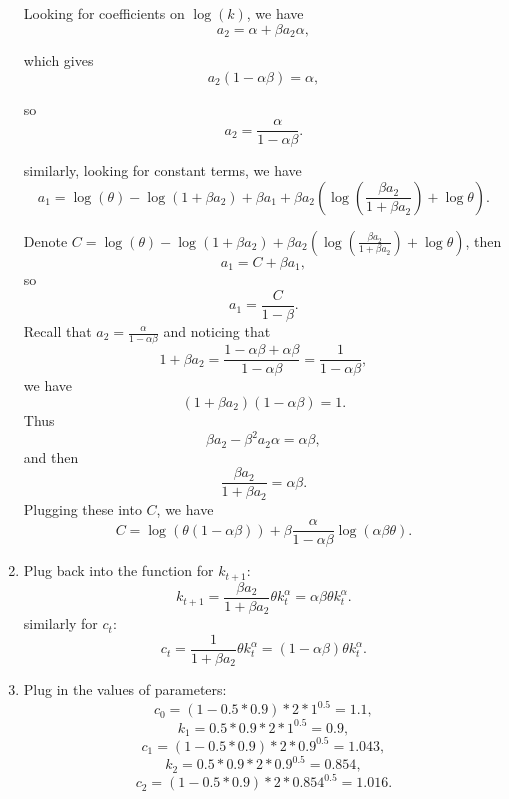 \documentclass[12pt]{article}
\begin{document}
\begin{enumerate}[label=\textbf{Question \arabic*:}, leftmargin=*, align=left]
Looking for coefficients on $\log(k)$, we have
\[
a_2 = \alpha + \beta a_2 \alpha,
\]

which gives
\[
a_2 (1 - \alpha \beta) = \alpha,
\]

so
\[
a_2 = \frac{\alpha}{1-\alpha\beta}.
\]

similarly, looking for constant terms, we have
\[
a_1 = \log(\theta) - \log(1+\beta a_2) + \beta a_1 
+ \beta a_2 \left( \log\left(\frac{\beta a_2}{1+\beta a_2}\right) + \log \theta \right).
\]

Denote $C = \log(\theta) - \log(1+\beta a_2) + \beta a_2 \left( \log\left(\frac{\beta a_2}{1+\beta a_2}\right) + \log \theta \right)$, then
\[
a_1 = C + \beta a_1,
\]
so
\[
a_1  = \frac{C}{1-\beta}.
\]
Recall that $a_2 = \frac{\alpha}{1-\alpha\beta}$ and noticing that 
\[
1+\beta a_2 = \frac{1-\alpha\beta + \alpha\beta}{1-\alpha\beta} = \frac{1}{1-\alpha\beta},
\]
we have
\[
(1+\beta a_2) (1-\alpha\beta) = 1.
\]
Thus
\[
\beta a_2-\beta^2 a_2 \alpha = \alpha\beta,
\]
and then
\[\frac{\beta a_2} {1+\beta a_2} = \alpha\beta.
\]
Plugging these into $C$, we have
\[
C = \log(\theta(1-\alpha\beta)) + \beta \frac{\alpha}{1-\alpha\beta} \log(\alpha\beta\theta).
\]
    \item 
    Plug back into the function for $k_{t+1}$:
\[
k_{t+1} = \frac{\beta a_2}{1+\beta a_2} \theta k_t^\alpha = \alpha\beta \theta k_t^\alpha.
\]
similarly for $c_t$:
\[
c_t = \frac{1}{1+\beta a_2} \theta k_t^\alpha = (1-\alpha\beta) \theta k_t^\alpha.
\]

    \item 
Plug in the values of parameters:
\[
c_0 = (1-0.5*0.9) * 2 *1^{0.5}=1.1,
\]
\[
k_1 = 0.5*0.9*2*1^{0.5}=0.9,
\]
\[c_1 = (1-0.5*0.9) * 2 *0.9^{0.5}=1.043,
\]
\[
k_2 = 0.5*0.9*2*0.9^{0.5}=0.854,
\]
\[
c_2 = (1-0.5*0.9) * 2 *0.854^{0.5}=1.016.
\]

\end{enumerate}
\end{document}
